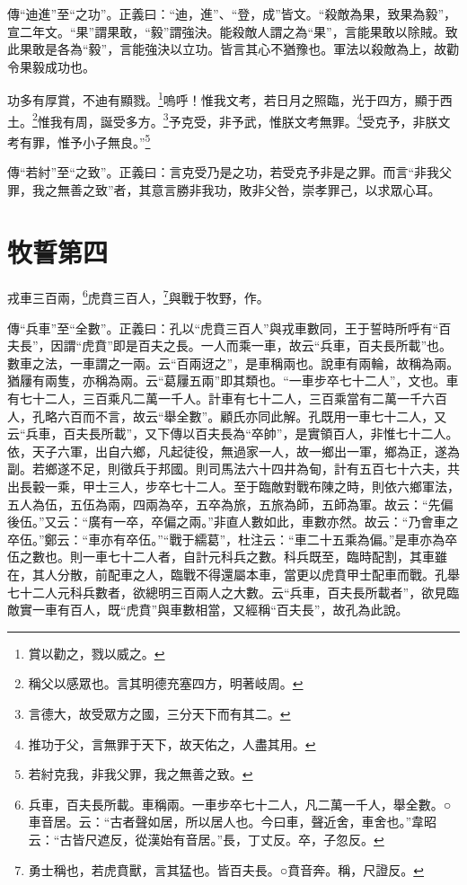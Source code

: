 {\noindent\zhuan{}\fzbyks 傳“迪進”至“之功”。正義曰：“迪，進”、“登，成”皆文。“殺敵為果，致果為毅”，宣二年文。“果”謂果敢，“毅”謂強決。能殺敵人謂之為“果”，言能果敢以除賊。致此果敢是各為“毅”，言能強決以立功。皆言其心不猶豫也。軍法以殺敵為上，故勸令果毅成功也。 \par}

功多有厚賞，不迪有顯戮。\footnote{賞以勸之，戮以威之。}嗚呼！惟我文考，若日月之照臨，光于四方，顯于西土。\footnote{稱父以感眾也。言其明德充塞四方，明著岐周。}惟我有周，誕受多方。\footnote{言德大，故受眾方之國，三分天下而有其二。}予克受，非予武，惟朕文考無罪。\footnote{推功于父，言無罪于天下，故天佑之，人盡其用。}受克予，非朕文考有罪，惟予小子無良。”\footnote{若紂克我，非我父罪，我之無善之致。}

{\noindent\zhuan{}\fzbyks 傳“若紂”至“之致”。正義曰：言克受乃是之功，若受克予非是之罪。而言“非我父罪，我之無善之致”者，其意言勝非我功，敗非父咎，崇孝罪己，以求眾心耳。 \par}

\section{牧誓第四}


戎車三百兩，\footnote{兵車，百夫長所載。車稱兩。一車步卒七十二人，凡二萬一千人，舉全數。○車音居。云：“古者聲如居，所以居人也。今曰車，聲近舍，車舍也。”韋昭云：“古皆尺遮反，從漢始有音居。”長，丁丈反。卒，子忽反。}虎賁三百人，\footnote{勇士稱也，若虎賁獸，言其猛也。皆百夫長。○賁音奔。稱，尺證反。}與戰于牧野，作。

{\noindent\zhuan{}\fzbyks 傳“兵車”至“全數”。正義曰：孔以“虎賁三百人”與戎車數同，王于誓時所呼有“百夫長”，因謂“虎賁”即是百夫之長。一人而乘一車，故云“兵車，百夫長所載”也。數車之法，一車謂之一兩。云“百兩迓之”，是車稱兩也。說車有兩輪，故稱為兩。猶屨有兩隻，亦稱為兩。云“葛屨五兩”即其類也。“一車步卒七十二人”，文也。車有七十二人，三百乘凡二萬一千人。計車有七十二人，三百乘當有二萬一千六百人，孔略六百而不言，故云“舉全數”。顧氏亦同此解。孔既用一車七十二人，又云“兵車，百夫長所載”，又下傳以百夫長為“卒帥”，是實領百人，非惟七十二人。依，天子六軍，出自六鄉，凡起徒役，無過家一人，故一鄉出一軍，鄉為正，遂為副。若鄉遂不足，則徵兵于邦國。則司馬法六十四井為甸，計有五百七十六夫，共出長轂一乘，甲士三人，步卒七十二人。至于臨敵對戰布陳之時，則依六鄉軍法，五人為伍，五伍為兩，四兩為卒，五卒為旅，五旅為師，五師為軍。故云：“先偏後伍。”又云：“廣有一卒，卒偏之兩。”非直人數如此，車數亦然。故云：“乃會車之卒伍。”鄭云：“車亦有卒伍。”“戰于繻葛”，杜注云：“車二十五乘為偏。”是車亦為卒伍之數也。則一車七十二人者，自計元科兵之數。科兵既至，臨時配割，其車雖在，其人分散，前配車之人，臨戰不得還屬本車，當更以虎賁甲士配車而戰。孔舉七十二人元科兵數者，欲總明三百兩人之大數。云“兵車，百夫長所載者”，欲見臨敵實一車有百人，既“虎賁”與車數相當，又經稱“百夫長”，故孔為此說。 \par}

